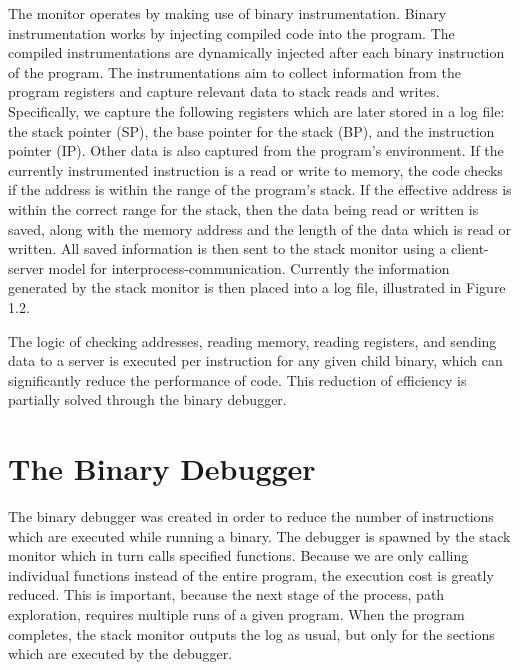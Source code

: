 \documentclass{article}
\begin{document}
    The monitor operates by making use of binary instrumentation. Binary
instrumentation works by injecting compiled code into the program. The compiled
instrumentations are dynamically injected after each binary instruction of the
program. The instrumentations aim to collect information from the program
registers and capture relevant data to stack reads and writes. Specifically, we
capture the following registers which are later stored in a log file: the stack
pointer (SP), the base pointer for the stack (BP), and the instruction pointer
(IP). Other data is also captured from the program's environment. If the
currently instrumented instruction is a read or write to memory, the code checks
if the address is within the range of the program's stack. If the effective
address is within the correct range for the stack, then the data being read or
written is saved, along with the memory address and the length of the data which
is read or written. All saved information is then sent to the stack monitor
using a client-server model for interprocess-communication. Currently the
information generated by the stack monitor is then placed into a log file,
illustrated in Figure 1.2.


    The logic of checking addresses, reading memory, reading registers, and
sending data to a server is executed per instruction for any given child binary,
which can significantly reduce the performance of code. This reduction of
efficiency is partially solved through the binary debugger.

\section{The Binary Debugger}

The binary debugger was created in order to reduce the number of instructions
which are executed while running a binary.
The debugger is spawned by the stack monitor which in turn calls specified
functions. Because we are only calling individual functions instead of the
entire program, the execution cost is greatly reduced. This is important,
because the next stage of the process, path exploration, requires multiple runs
of a given program. When the program completes, the stack monitor outputs the
log as usual, but only for the sections which are executed by the debugger.
\end{document}
